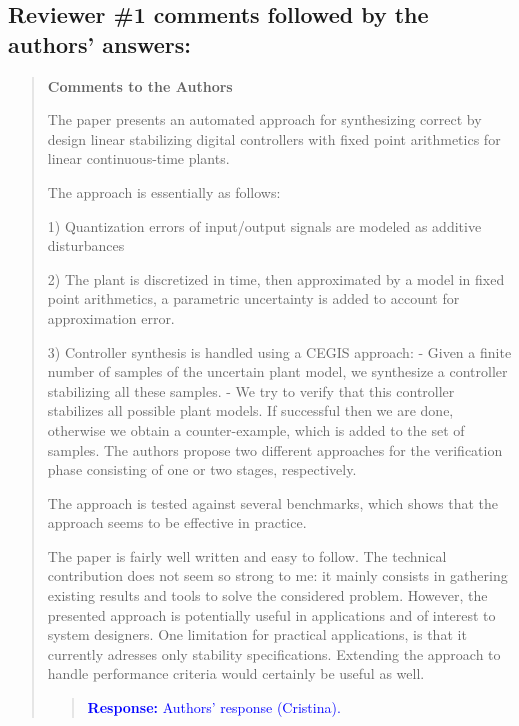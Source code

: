 \documentclass[11pt]{article}
\newcommand\vi{\vspace{\baselineskip}}
\begin{document}
\setcounter{page}{1}
\thispagestyle{empty}

\vspace*{1cm}

\vi
\subsection*{Reviewer \#1 comments followed by the authors' answers:}

\begin{quote}

{\bf Comments to the Authors}

The paper presents an automated approach for synthesizing correct by design linear stabilizing digital controllers with fixed point arithmetics for linear continuous-time plants. 

The approach is essentially as follows:

1) Quantization errors of input/output signals are modeled as additive disturbances

2) The plant is discretized in time, then approximated by a model in fixed point arithmetics, a parametric uncertainty is added to account for approximation error.

3) Controller synthesis is handled using a CEGIS approach:
    - Given a finite number of samples of the uncertain plant model, we synthesize a controller stabilizing all these samples. 
    - We try to verify that this controller stabilizes all possible plant models. If successful then we are done, otherwise we obtain a counter-example, which is added to the set of samples. The authors propose two different approaches for the verification phase consisting of one or two stages, respectively.

The approach is tested against several benchmarks, which shows that the approach seems to be effective in practice. 

The paper is fairly well written and easy to follow. The technical contribution does not seem so strong to me: it mainly consists in gathering existing results and tools to solve the considered problem. However, the presented approach is potentially useful in applications and of interest to system designers. One limitation for practical applications, is that it currently adresses only stability specifications. Extending the approach to handle performance criteria would certainly be useful as well. 

\begin{quote}
\textcolor{blue}{\textbf{Response:} Authors' response (Cristina).}
\end{quote}


\end{quote}
\end{document}
